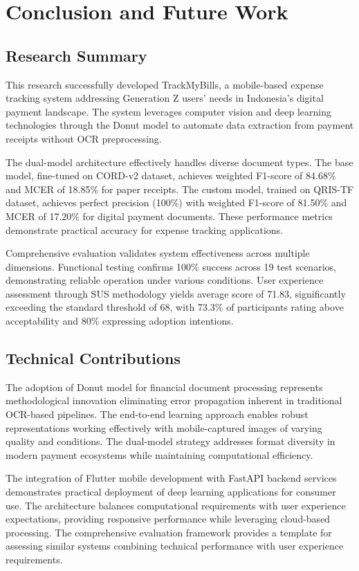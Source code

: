 \section{Conclusion and Future Work}

\subsection{Research Summary}
This research successfully developed TrackMyBills, a mobile-based expense tracking system addressing Generation Z users' needs in Indonesia's digital payment landscape. The system leverages computer vision and deep learning technologies through the Donut model to automate data extraction from payment receipts without OCR preprocessing.

The dual-model architecture effectively handles diverse document types. The base model, fine-tuned on CORD-v2 dataset, achieves weighted F1-score of 84.68\% and MCER of 18.85\% for paper receipts. The custom model, trained on QRIS-TF dataset, achieves perfect precision (100\%) with weighted F1-score of 81.50\% and MCER of 17.20\% for digital payment documents. These performance metrics demonstrate practical accuracy for expense tracking applications.

Comprehensive evaluation validates system effectiveness across multiple dimensions. Functional testing confirms 100\% success across 19 test scenarios, demonstrating reliable operation under various conditions. User experience assessment through SUS methodology yields average score of 71.83, significantly exceeding the standard threshold of 68, with 73.3\% of participants rating above acceptability and 80\% expressing adoption intentions.

\subsection{Technical Contributions}
The adoption of Donut model for financial document processing represents methodological innovation eliminating error propagation inherent in traditional OCR-based pipelines. The end-to-end learning approach enables robust representations working effectively with mobile-captured images of varying quality and conditions. The dual-model strategy addresses format diversity in modern payment ecosystems while maintaining computational efficiency.

The integration of Flutter mobile development with FastAPI backend services demonstrates practical deployment of deep learning applications for consumer use. The architecture balances computational requirements with user experience expectations, providing responsive performance while leveraging cloud-based processing. The comprehensive evaluation framework provides a template for assessing similar systems combining technical performance with user experience requirements.


